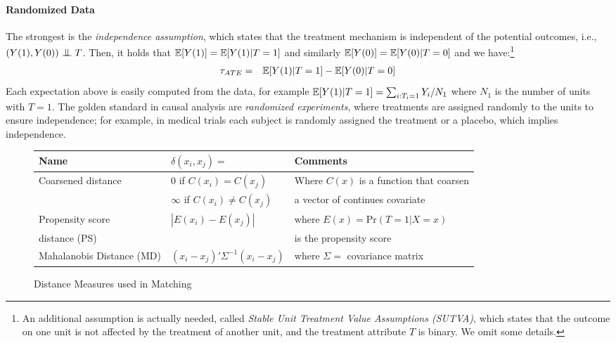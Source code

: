 \paragraph*{Randomized Data}
The strongest is the {\em independence assumption}, which states that
the treatment mechanism is independent of the potential outcomes,
i.e., $(Y(1), Y(0)) \bigCI T$. Then, it holds that
$\mathbb{E}[Y(1)]=\mathbb{E}[Y(1)|T=1]$ and similarly $\mathbb{E}[Y(0)]=\mathbb{E}[Y(0)|T=0]$ and we
have:\footnote{An additional assumption is actually needed, called
  \emph{Stable Unit Treatment Value Assumptions (SUTVA)}, which states
  that the outcome on one unit is not affected by the treatment of
  another unit, and the treatment attribute $T$ is binary.  We omit
  some details.}
%
\vspace{-.1cm}
\begin{eqnarray}
  {\tau_{ATE}} &=& \mathbb{E}[Y(1)|T=1]-\mathbb{E}[Y(0)|T=0] \label{eq:indeass}
\end{eqnarray}
Each expectation above is easily computed from the data, for example
$\mathbb{E}[Y(1)|T=1] = \sum_{i: T_i=1} Y_i / N_1$ where $N_1$ is the number
of units with $T=1$.  The golden standard in causal analysis are {\em
  randomized experiments}, where treatments are assigned randomly to
the units to ensure independence; for example, in medical trials each
subject is randomly assigned the treatment or a placebo, which implies
independence.
\begin{figure*} \scriptsize
  \centering
  \begin{tabular}{|l|l|l|} \hline
    \bf{Name} &  $\delta(x_i,x_j)=$ & \bf{Comments} \\ \hline
Coarsened distance & 0 if $C(x_i)=C(x_j)$ & Where $C(x)$ is a function that coarsen \\
               & $\infty$ if $C(x_i) \neq C(x_j)$ & a vector of continues covariate~\cite{IacKinPor09}\\ \hline
Propensity score  & $|E(x_i) - E(x_j)|$ & where $E(x) = \textrm{Pr}(T = 1 | X=x)$\\
distance (PS)   &  & is the propensity score~\cite{Rubin1983b} \\ \hline
Mahalanobis Distance (MD) & $(x_i-x_j)'\Sigma^{-1} (x_i-x_j)$ & where $\Sigma=$ covariance matrix~\cite{Stuart10} \\ \hline
  \end{tabular}
  \caption{Distance Measures used in Matching}
  \label{fig:metrics}
\end{figure*}
\vspace{-0.3cm}
